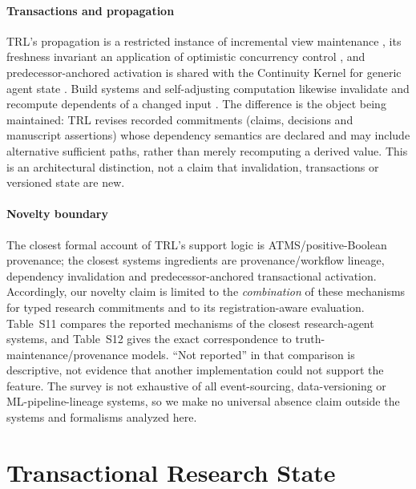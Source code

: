 \documentclass[cmc,article,submit,moreauthors,pdftex]{Definitions/tsp}
\begin{document}
\paragraph{Transactions and propagation}
TRL's propagation is a restricted instance of incremental view maintenance \cite{gupta1995maintenance}, its freshness invariant an application of optimistic concurrency control \cite{kung1981optimistic}, and predecessor-anchored activation is shared with the Continuity Kernel for generic agent state \cite{he2026continuity}. Build systems and self-adjusting computation likewise invalidate and recompute dependents of a changed input \cite{feldman1979make,mokhov2018build,acar2009selfadjusting}. The difference is the object being maintained: TRL revises recorded commitments (claims, decisions and manuscript assertions) whose dependency semantics are declared and may include alternative sufficient paths, rather than merely recomputing a derived value. This is an architectural distinction, not a claim that invalidation, transactions or versioned state are new.

\paragraph{Novelty boundary}
The closest formal account of TRL's support logic is ATMS/positive-Boolean provenance; the closest systems ingredients are provenance/workflow lineage, dependency invalidation and predecessor-anchored transactional activation. Accordingly, our novelty claim is limited to the \emph{combination} of these mechanisms for typed research commitments and to its registration-aware evaluation. Table~S11 compares the reported mechanisms of the closest research-agent systems, and Table~S12 gives the exact correspondence to truth-maintenance/provenance models. ``Not reported'' in that comparison is descriptive, not evidence that another implementation could not support the feature. The survey is not exhaustive of all event-sourcing, data-versioning or ML-pipeline-lineage systems, so we make no universal absence claim outside the systems and formalisms analyzed here.

\section{Transactional Research State}
\label{sec:trl_method}
\end{document}
